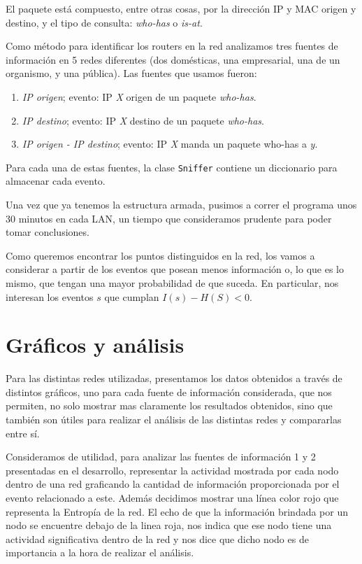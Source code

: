 \documentclass[a4paper, 11pt]{article}
\begin{document}
El paquete est\'a compuesto, entre otras cosas, por la direcci\'on IP y MAC origen y destino, y el tipo de consulta: \textit{who-has} o \textit{is-at}. 

Como m\'etodo para identificar los routers en la red analizamos tres fuentes de informaci\'on en 5 redes diferentes (dos dom\'esticas, una empresarial, una de un organismo, y una p\'ublica). Las fuentes que usamos fueron: 

\begin{enumerate}
 \item {\it IP origen}; evento: IP {\it X} origen de un paquete {\it who-has}.
 \item {\it IP destino}; evento: IP {\it X} destino de un paquete {\it who-has}.
 \item {\it IP origen - IP destino}; evento: IP {\it X} manda un paquete who-has a {\it y}.
\end{enumerate}

Para cada una de estas fuentes, la clase \texttt{Sniffer} contiene un diccionario para almacenar cada evento. 

Una vez que ya tenemos la estructura armada, pusimos a correr el programa unos 30 minutos en cada LAN, un tiempo que consideramos prudente para poder tomar conclusiones. 

Como queremos encontrar los puntos distinguidos en la red, los vamos a considerar a partir de los eventos que posean menos informaci\'on o, lo que es lo mismo, que tengan una mayor probabilidad de que suceda. En particular, nos interesan los eventos $s$ que cumplan $I(s) - H(S) < 0$. 

\section{Gráficos y análisis}

Para las distintas redes utilizadas, presentamos los datos obtenidos a trav\'es de distintos gr\'aficos, uno para cada fuente de informaci\'on considerada, que nos permiten, no solo mostrar mas claramente los resultados obtenidos, sino que tambi\'en son \'utiles para realizar el an\'alisis de las distintas redes y compararlas entre s\'i.

Consideramos de utilidad, para analizar las fuentes de informaci\'on 1 y 2 presentadas en el desarrollo, representar la actividad mostrada por cada nodo dentro de una red graficando la cantidad de informaci\'on  proporcionada por el evento relacionado a este. Adem\'as decidimos mostrar una l\'inea color rojo que representa la Entrop\'ia de la red. El echo de que la informaci\'on brindada por un nodo se encuentre debajo de la linea roja, nos indica que ese nodo tiene una actividad significativa dentro de la red y nos dice que dicho nodo es de importancia a la hora de realizar el an\'alisis.
\end{document}
